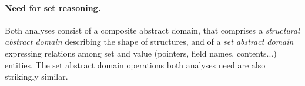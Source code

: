 \paragraph{Need for set reasoning.}
Both analyses consist of a composite abstract domain, that comprises a
{\em structural abstract domain} describing the shape of structures, and
of a {\em set abstract domain} expressing relations among set and value
(pointers, field names, contents...) entities.
The set abstract domain operations both analyses need are also strikingly
similar.

